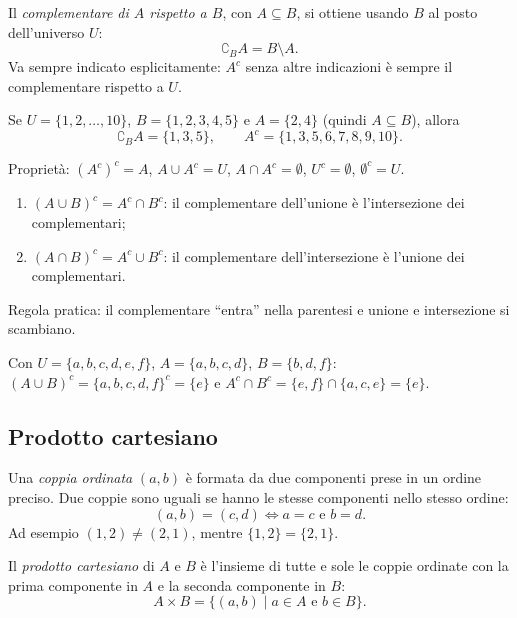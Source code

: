 \documentclass[11pt,a4paper]{article}
\begin{document}
Il \emph{complementare di $A$ rispetto a $B$}, con $A \subseteq B$, si
ottiene usando $B$ al posto dell'universo $U$:
\[
\complement_B A = B \setminus A.
\]
Va sempre indicato esplicitamente: $A^c$ senza altre indicazioni è sempre
il complementare rispetto a $U$.

\begin{esempio}
Se $U = \{1, 2, \dots, 10\}$, $B = \{1, 2, 3, 4, 5\}$ e $A = \{2, 4\}$
(quindi $A \subseteq B$), allora
\[
\complement_B A = \{1, 3, 5\}, \qquad A^c = \{1, 3, 5, 6, 7, 8, 9, 10\}.
\]
\end{esempio}

Proprietà: $(A^c)^c = A$, \quad $A \cup A^c = U$, \quad
$A \cap A^c = \emptyset$, \quad $U^c = \emptyset$, \quad $\emptyset^c = U$.

\begin{teorema}
\begin{enumerate}
    \item $(A \cup B)^c = A^c \cap B^c$: il complementare dell'unione
          è l'intersezione dei complementari;
    \item $(A \cap B)^c = A^c \cup B^c$: il complementare
          dell'intersezione è l'unione dei complementari.
\end{enumerate}
\end{teorema}

Regola pratica: il complementare ``entra'' nella parentesi e unione e
intersezione si scambiano.

\begin{esempio}
Con $U = \{a, b, c, d, e, f\}$, $A = \{a, b, c, d\}$, $B = \{b, d, f\}$:
$(A \cup B)^c = \{a,b,c,d,f\}^c = \{e\}$ e
$A^c \cap B^c = \{e, f\} \cap \{a, c, e\} = \{e\}$.
\end{esempio}

\subsection{Prodotto cartesiano}

\begin{definizione}
Una \emph{coppia ordinata} $(a, b)$ è formata da due componenti prese in un
ordine preciso. Due coppie sono uguali se hanno le stesse componenti nello
stesso ordine:
\[
(a, b) = (c, d) \iff a = c \text{ e } b = d.
\]
Ad esempio $(1, 2) \neq (2, 1)$, mentre $\{1, 2\} = \{2, 1\}$.
\end{definizione}

\begin{definizione}
Il \emph{prodotto cartesiano} di $A$ e $B$ è l'insieme di tutte e sole le
coppie ordinate con la prima componente in $A$ e la seconda componente
in $B$:
\[
A \times B = \{(a, b) \mid a \in A \text{ e } b \in B\}.
\]
\end{definizione}
\end{document}
